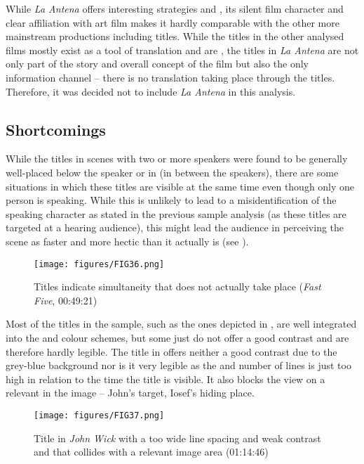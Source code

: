 While \textit{La Antena} offers interesting  strategies and , its silent film character and clear affiliation with art film makes it hardly comparable with the other more mainstream productions including  titles. While the titles in the other analysed films mostly exist as a tool of translation and are , the titles in \textit{La Antena} are not only part of the story and overall concept of the film but also the only information channel – there is no translation taking place through the titles. Therefore, it was decided not to include \textit{La Antena} in this analysis.

\subsection{Shortcomings}\label{sec:4.2.2}

While the titles in scenes with two or more speakers were found to be generally well-placed below the speaker or in  (in between the speakers), there are some situations in which these titles are visible at the same time even though only one person is speaking. While this is unlikely to lead to a misidentification of the speaking character as stated in the previous sample analysis (as these titles are targeted at a hearing audience), this might lead the audience in perceiving the scene as faster and more hectic than it actually is (see ).

\begin{figure}
\texttt{[image: figures/FIG36.png]}
\caption{Titles indicate simultaneity that does not actually take place (\textit{Fast Five}, 00:49:21)}
\label{fig:FIG36}
\end{figure}

Most of the titles in the sample, such as the ones depicted in , are well integrated into the  and colour schemes, but some just do not offer a good contrast and are therefore hardly legible. The title in  offers neither a good contrast due to the grey-blue background nor is it very legible as the  and number of lines is just too high in relation to the time the title is visible. It also blocks the view on a relevant  in the image – John’s target, Iosef’s hiding place.

\begin{figure}
\texttt{[image: figures/FIG37.png]}
\caption{Title in \textit{John Wick} with a too wide line spacing and weak contrast and that collides with a relevant image area (01:14:46)}
\label{fig:FIG37}
\end{figure}

